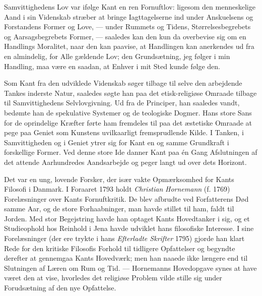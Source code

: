 \documentclass[12pt,a4paper,openany]{book}
\newcommand{\opage}[1]{\marginnote{\footnotesize\textit{[#1]}}}
\begin{document}
Samvittighedens Lov var ifølge Kant en ren Fornuftlov: ligesom den menneskelige
Aand i sin Videnskab stræber at bringe Iagttagelserne ind under Anskuelsens og
Forstandens
\setcounter{footnote}{0}%
\opage{26}Former og Love, --- under Rummets og Tidens, Størrelsesbegrebets og
Aarsagsbegrebets Former, --- saaledes kan den kun da overbevise sig om en
Handlings Moralitet, naar den kan paavise, at Handlingen kan anerkendes ud fra
en almindelig, for Alle gældende Lov; den Grundsætning, jeg følger i min
Handling, maa være en saadan, at Enhver i mit Sted kunde følge den.

Som Kant fra den udviklede Videnskab søger tilbage til selve den arbejdende
Tankes inderste Natur, saaledes søgte han paa det etisk-religiøse Omraade
tilbage til Samvittighedens Selvlovgivning. Ud fra de Principer, han saaledes
vandt, bedømte han de spekulative Systemer og de teologiske Dogmer. Hans store
Sans for de oprindelige Kræfter førte ham fremdeles til paa det æstetiske
Omraade at pege paa Geniet som Kunstens uvilkaarligt fremsprudlende Kilde. I
Tanken, i Samvittigheden og i Geniet ytrer sig for Kant en og samme Grundkraft
i forskellige Former. Ved denne store Ide danner Kant paa én Gang Afslutningen
af det attende Aarhundredes Aandsarbejde og peger langt ud over dets Horizont.

Det var en ung, lovende Forsker, der især vakte Opmærksomhed for Kants Filosofi
i Danmark. I Foraaret 1793 holdt \emph{Christian} \emph{Hornemann} (f. 1769)
Forelæsninger over Kants Fornuftkritik. De blev afbrudte ved Forfatterens Død
samme Aar, og de store Forhaabninger, man havde stillet til ham, faldt til
Jorden. Med stor Begejstring havde han optaget Kants Hovedtanker i sig, og et
Studieophold hos Reinhold i Jena havde udviklet hans filosofiske Interesse. I
sine Forelæsninger (der ere trykte i hans \textit{Efterladte Skrifter} 1795)
gjorde han klart Rede for den kritiske Filosofis Forhold til tidligere
Opfattelser og begyndte derefter at gennemgaa Kants Hovedværk; men han naaede
ikke længere end til Slutningen af Læren om Rum og Tid. --- Hornemanns
Hovedopgave synes at have været den at vise, hvorledes det religiøse Problem
vilde stille sig under Forudsætning af den nye Opfattelse.
\end{document}
